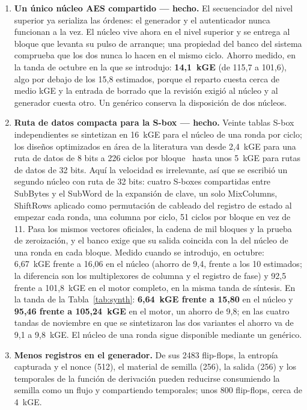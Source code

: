 \begin{enumerate}
\item \textbf{Un único núcleo AES compartido --- hecho.} El secuenciador
del nivel superior ya serializa las órdenes: el generador y el
autenticador nunca funcionan a la vez. El núcleo vive ahora en el nivel
superior y se entrega al bloque que levanta su pulso de arranque; una
propiedad del banco del sistema comprueba que los dos nunca lo hacen en
el mismo ciclo. Ahorro medido, en la tanda de octubre en la que se
introdujo: \textbf{14,1~kGE} (de 115,7 a 101,6), algo
por debajo de los 15,8 estimados, porque el reparto cuesta cerca de medio
kGE y la entrada de borrado que la revisión exigió al núcleo y al
generador cuesta otro. Un genérico conserva la disposición de dos
núcleos.
\item \textbf{Ruta de datos compacta para la S-box --- hecho.} Veinte
tablas S-box independientes se sintetizan en 16~kGE para el núcleo de
una ronda por ciclo; los diseños optimizados en área de la literatura van
desde 2,4~kGE para una ruta de datos de 8 bits a 226 ciclos por
bloque~\cite{moradi2011pushing} hasta unos 5~kGE para rutas de datos de
32 bits. Aquí la velocidad es irrelevante, así que se escribió un segundo
núcleo con ruta de 32 bits: cuatro S-boxes compartidas entre SubBytes y
el SubWord de la expansión de clave, un solo MixColumns, ShiftRows
aplicado como permutación de cableado del registro de estado al empezar
cada ronda, una columna por ciclo, 51 ciclos por bloque en vez de 11.
Pasa los mismos vectores oficiales, la cadena de mil bloques y la prueba
de zeroización, y el banco exige que su salida coincida con la del núcleo
de una ronda en cada bloque. Medido cuando se introdujo, en octubre:
6,67~kGE frente a 16,06 en
el núcleo (ahorro de 9,4, frente a los 10 estimados; la diferencia son
los multiplexores de columna y el registro de fase) y 92,5 frente
a 101,8~kGE en el motor completo, en la misma tanda de síntesis. En la
tanda de la Tabla~\ref{tab:synth}: \textbf{6,64~kGE frente a 15,80} en
el núcleo y \textbf{95,46 frente a 105,24~kGE} en el motor, un ahorro de
9,8; en las cuatro tandas de noviembre en que se sintetizaron las dos
variantes el ahorro va de 9,1 a 9,8~kGE. El
núcleo de una ronda sigue disponible mediante un genérico.
\item \textbf{Menos registros en el generador.} De sus 2483 flip-flops,
la entropía capturada y el nonce (512), el material de semilla (256), la salida
(256) y los temporales de la función de derivación pueden reducirse
consumiendo la semilla como un flujo y compartiendo temporales; unos 800
flip-flops, cerca de 4~kGE.
\end{enumerate}

